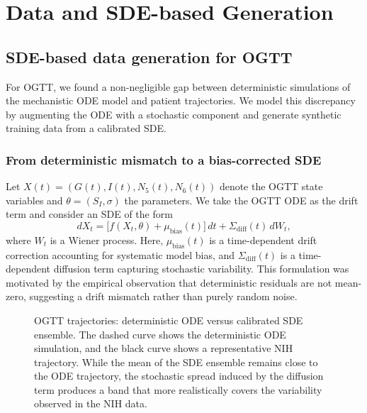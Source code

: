 \section{Data and SDE-based Generation}
\label{sec:data_sde}

\subsection{SDE-based data generation for OGTT}
\label{subsec:sde}

For OGTT, we found a non-negligible gap between deterministic simulations of the mechanistic ODE model and patient trajectories.
We model this discrepancy by augmenting the ODE with a stochastic component and generate synthetic training data from a calibrated SDE.

\subsubsection{From deterministic mismatch to a bias-corrected SDE}
\label{subsubsec:sde-form}

Let $X(t)=(G(t),I(t),N_5(t),N_6(t))$ denote the OGTT state variables and $\theta=(S_I,\sigma)$ the parameters.
We take the OGTT ODE as the drift term and consider an SDE of the form
\begin{equation}
\label{eq:sde-form}
dX_t = \bigl[f(X_t,\theta) + \mu_{\mathrm{bias}}(t)\bigr]\,dt + \Sigma_{\mathrm{diff}}(t)\,dW_t,
\end{equation}
where $W_t$ is a Wiener process.
Here, $\mu_{\mathrm{bias}}(t)$ is a time-dependent drift correction accounting for systematic model bias,
and $\Sigma_{\mathrm{diff}}(t)$ is a time-dependent diffusion term capturing stochastic variability.
This formulation was motivated by the empirical observation that deterministic residuals are not mean-zero, suggesting a drift mismatch rather than purely random noise.

\begin{figure}[t]
    \centering
    \caption{OGTT trajectories: deterministic ODE versus calibrated SDE ensemble.
    The dashed curve shows the deterministic ODE simulation, and the black curve shows a representative NIH trajectory.
    While the mean of the SDE ensemble remains close to the ODE trajectory, the stochastic spread induced by the diffusion term produces a band
    that more realistically covers the variability observed in the NIH data.}
    \label{fig:sde-effect}
\end{figure}


